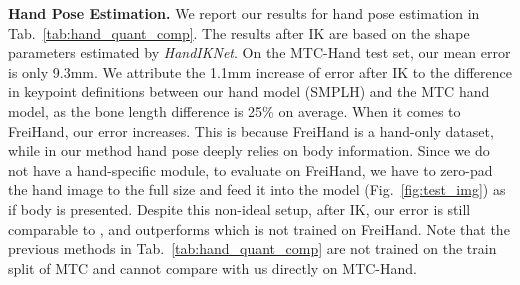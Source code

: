 \documentclass[final]{cvpr}
\begin{document}
\begin{table}[t]
  \centering
  \caption{
Body MPJPE on HUMBI.
We demonstrate that incorporating \textit{BodyIKNet} further lowers error.
The small gap between IK-$\beta$ and GT-$\beta$ indicates the high accuracy of body shape estimation.
}
  \label{tab:body_quant_humbi}
\end{table}
\par
\noindent \textbf{Hand Pose Estimation.}
We report our results for hand pose estimation in Tab.~\ref{tab:hand_quant_comp}.
The results after IK are based on the shape parameters estimated by \textit{HandIKNet}.
On the MTC-Hand test set, our mean error is only 9.3mm.
We attribute the 1.1mm increase of error after IK to the difference in keypoint definitions between our hand model (SMPLH) and the MTC hand model, as the bone length difference is 25\% on average.
When it comes to FreiHand, our error increases.
This is because FreiHand is a hand-only dataset, while in our method hand pose deeply relies on body information.
Since we do not have a hand-specific module, to evaluate on FreiHand, we have to zero-pad the hand image to the full size and feed it into the model (Fig.~\ref{fig:test_img}) as if body is presented.
Despite this non-ideal setup, after IK, our error is still comparable to \cite{choutas2020monocular}, and outperforms \cite{zhou2020monocular}
which is not trained on FreiHand.
Note that the previous methods in Tab.~\ref{tab:hand_quant_comp} are not trained on the train split of MTC and cannot compare with us directly on MTC-Hand.
\end{document}
